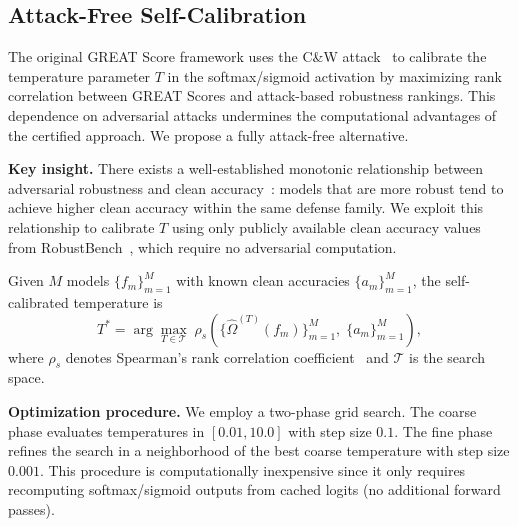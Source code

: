 \subsection{Attack-Free Self-Calibration}
\label{sec:calibration}

The original GREAT Score framework uses the C\&W attack~\citep{carlini2017evaluatingrobustnessneuralnetworks} to calibrate the temperature parameter $T$ in the softmax/sigmoid activation by maximizing rank correlation between GREAT Scores and attack-based robustness rankings. This dependence on adversarial attacks undermines the computational advantages of the certified approach. We propose a fully attack-free alternative.

\textbf{Key insight.} There exists a well-established monotonic relationship between adversarial robustness and clean accuracy~\citep{tsipras2019robustnessoddsaccuracy}: models that are more robust tend to achieve higher clean accuracy within the same defense family. We exploit this relationship to calibrate $T$ using only publicly available clean accuracy values from RobustBench~\citep{croce2021robustbenchstandardizedadversarialrobustness}, which require no adversarial computation.

\begin{definition}
\label{def:self_cal}
Given $M$ models $\{f_m\}_{m=1}^{M}$ with known clean accuracies $\{a_m\}_{m=1}^{M}$, the self-calibrated temperature is
\begin{equation}
    T^* = \arg\max_{T \in \mathcal{T}} \; \rho_s\!\left(\bigl\{\hat{\Omega}^{(T)}(f_m)\bigr\}_{m=1}^{M},\; \bigl\{a_m\bigr\}_{m=1}^{M}\right),
    \label{eq:self_calibration}
\end{equation}
where $\rho_s$ denotes Spearman's rank correlation coefficient~\citep{spearman1904proof} and $\mathcal{T}$ is the search space.
\end{definition}

\textbf{Optimization procedure.} We employ a two-phase grid search. The coarse phase evaluates temperatures in $[0.01, 10.0]$ with step size $0.1$. The fine phase refines the search in a neighborhood of the best coarse temperature with step size $0.001$. This procedure is computationally inexpensive since it only requires recomputing softmax/sigmoid outputs from cached logits (no additional forward passes).

